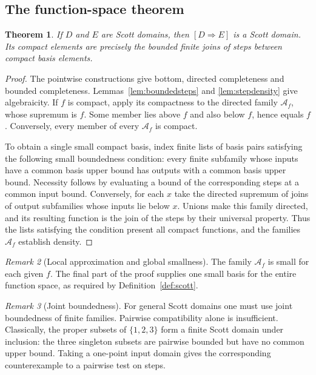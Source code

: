 \documentclass[11pt,a4paper]{article}
\newtheorem{theorem}{Theorem}[section]
\theoremstyle{definition}
\theoremstyle{remark}
\newtheorem{remark}[theorem]{Remark}
\begin{document}
\subsection{The function-space theorem}

\begin{theorem}\label{thm:exponential}
If $D$ and $E$ are Scott domains, then $[D\Rightarrow E]$ is a Scott
domain. Its compact elements are precisely the bounded finite joins of
steps between compact basis elements.
\end{theorem}
\begin{proof}
The pointwise constructions give bottom, directed completeness and
bounded completeness. Lemmas~\ref{lem:boundedsteps} and
\ref{lem:stepdensity} give algebraicity. If $f$ is compact, apply its
compactness to the directed family $\mathcal A_f$, whose supremum is
$f$. Some member lies above $f$ and also below $f$, hence equals $f$.
Conversely, every member of every $\mathcal A_f$ is compact.

To obtain a single small compact basis, index finite lists of basis
pairs satisfying the following small boundedness condition: every finite
subfamily whose inputs have a common basis upper bound has outputs with
a common basis upper bound. Necessity follows by evaluating a bound of
the corresponding steps at a common input bound. Conversely, for each
$x$ take the directed supremum of joins of output subfamilies whose
inputs lie below $x$. Unions make this family directed, and its resulting
function is the join of the steps by their universal property. Thus the
lists satisfying the condition present all compact functions, and the
families $\mathcal A_f$ establish density.
\end{proof}

\begin{remark}[Local approximation and global smallness]
The family $\mathcal A_f$ is small for each given $f$. The final part of
the proof supplies one small basis for the entire function space, as
required by Definition~\ref{def:scott}.
\end{remark}

\begin{remark}[Joint boundedness]
For general Scott domains one must use joint boundedness of finite
families. Pairwise compatibility alone is insufficient. Classically, the
proper subsets of $\{1,2,3\}$ form a finite Scott domain under inclusion:
the three singleton subsets are pairwise bounded but have no common
upper bound. Taking a one-point input domain gives the corresponding
counterexample to a pairwise test on steps.
\end{remark}
\end{document}
